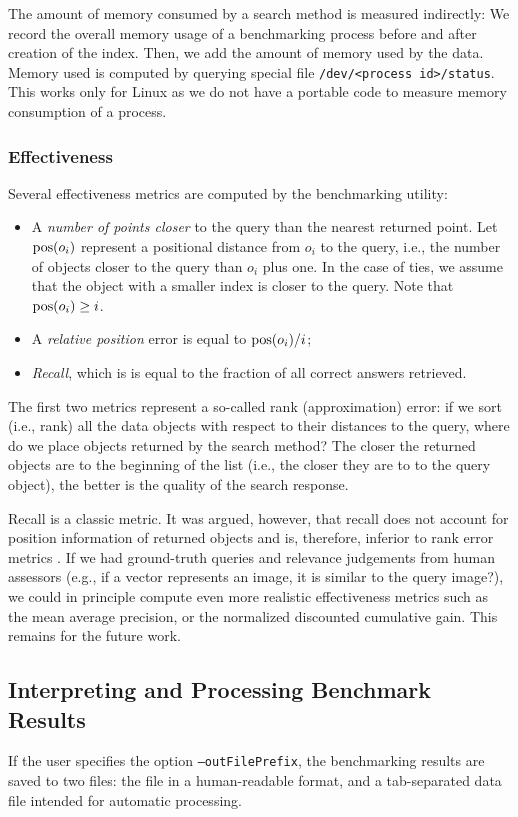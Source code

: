 \documentclass[runningheads,a4paper]{llncs}
\newcommand{\ttt}[1]{\texttt{#1}}
\newcommand{\pos}{\mbox{\rm pos}}
\begin{document}
{The amount of memory consumed by a search method is measured indirectly: 
We record the overall memory usage of a benchmarking process before and after creation of the index. Then, we add the amount of memory used by the data.
Memory used is computed by querying special file \ttt{/dev/<process id>/status}. 
This works only for Linux as we do not have a portable code to measure memory consumption of a process.

\subsubsection{Effectiveness}

Several effectiveness metrics are computed by the benchmarking utility:
\begin{itemize}
\item  A \emph{number of points closer} to the query than the nearest returned point.
Let $\pos(o_i)$ represent a positional distance from $o_i$ to the query, 
i.e., the number of objects closer to the query than $o_i$ plus one.
In the case of ties, we assume that the object with a smaller index is closer to the query.
Note that $\pos(o_i) \ge i$.
\item A \emph{relative position} error is equal to $\pos(o_i)/i$;
\item \emph{Recall},  which is is equal to the fraction of all correct answers retrieved.
\end{itemize}
The first two metrics represent a so-called rank (approximation) error:
if we sort (i.e., rank) all the data objects with respect to their distances to the query,
where do we place objects returned by the search method?
The closer the returned objects are to the beginning of the list (i.e., 
the closer they are to to the query object), the better is the quality of the search response.

Recall is a classic metric. 
It was argued, however, 
that recall does not account for position information of returned objects
and is, therefore, inferior to rank error metrics \cite{Amato_et_al:2003,Cayton:2008}.
If we had ground-truth queries and relevance judgements from human assessors (e.g.,
if a vector represents an image, it is similar to the query image?),
we could in principle compute even more realistic effectiveness metrics 
such as the mean average precision,
or the normalized discounted cumulative gain.
This remains for the future work.

\subsection{Interpreting and Processing Benchmark Results}
If the user specifies the option \ttt{--outFilePrefix},
the benchmarking results are saved to two files:
the file in a human-readable format,
and a tab-separated data file intended for automatic processing.

}
\end{document}
